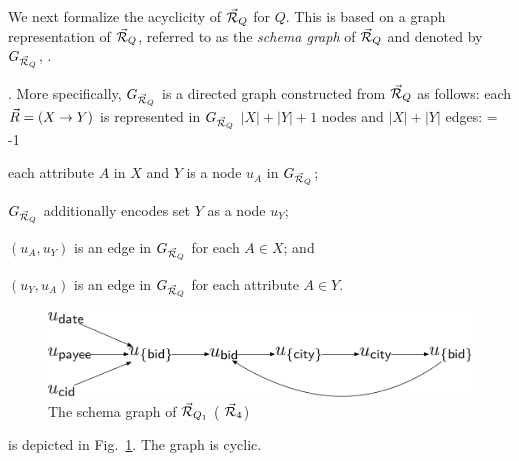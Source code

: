 
We next formalize the acyclicity of \bds $\vec{{\mathcal R}}_{Q}$ for $Q$.
This  
is based on a graph representation of $\vec{{\mathcal R}}_{Q}$, referred to
as the {\em schema graph} of $\vec{{\mathcal R}}_{Q}$ and denoted by
$G_{\vec{{\mathcal R}}_{Q}}$, .


. More specifically, $G_{\vec{{\mathcal R}}_{Q}}$ is a
directed graph constructed from $\vec{{\mathcal R}}_{Q}$ as follows: each \bs
$\vec{R} = (X\rightarrow Y)$ is represented in $G_{\vec{{\mathcal R}}_{Q}}$  %
$|X|+|Y|+1$
nodes and $|X|+|Y|$ edges:
\looseness = -1
\mbi
\item each attribute $A$ in $X$ and $Y$ is a node $u_{A}$ in $G_{\vec{{\mathcal R}}_{Q}}$;
\item $G_{\vec{{\mathcal R}}_{Q}}$ additionally encodes set $Y$ as a node $u_{Y}$;
\item $(u_{A}, u_{Y})$ is an edge in $G_{\vec{{\mathcal R}}_{Q}}$ for each $A\in X$; and
\item $(u_{Y}, u_{A})$ is an edge in $G_{\vec{{\mathcal R}}_{Q}}$ for each attribute $A\in Y$.
\mei 
\vspace{-0.7ex}

\begin{figure}
\includegraphics[width=1\columnwidth]{fig/schemagraph.pdf}
\vspace{-2.7ex}
\caption{The schema graph of $\vec{{\mathcal R}}_{Q_{1}}$ (\ie
  $\vec{{\mathcal R}}_{4}$) \label{fig-schemagraph}}
\vspace{-2.7ex}
\end{figure}

\begin{example}\label{exa-schemagraph}
 is depicted in
Fig.~\ref{fig-schemagraph}. The graph is cyclic.
\end{example}


